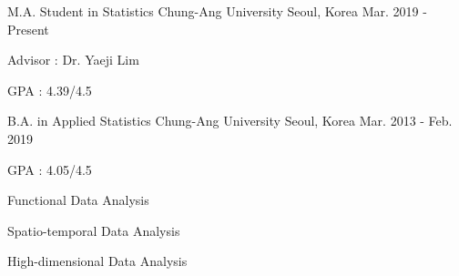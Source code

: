 \documentclass[11pt, a4paper]{awesome-cv} %
\begin{document}
\makecvheader %



\begin{cventries}
	\cventry
	{M.A. Student in Statistics} %
	{Chung-Ang University} %
	{Seoul, Korea} %
	{Mar. 2019 - Present} %
	{ %
		\begin{cvitems}
			\item {Advisor : Dr. Yaeji Lim}
			\item {GPA : 4.39/4.5}
		\end{cvitems}
	}
	
	\cventry
	{B.A. in Applied Statistics} %
	{Chung-Ang University} %
	{Seoul, Korea} %
	{Mar. 2013 - Feb. 2019} %
	{ %
		\begin{cvitems}
			\item {GPA : 4.05/4.5}
		\end{cvitems}
	}
\end{cventries}



\begin{cventries}
	\begin{cvitems}
		\begin{spacing}{1.2}
			\item {Functional Data Analysis}
			\item {Spatio-temporal Data Analysis}
			\item {High-dimensional Data Analysis}
		\end{spacing}
	\end{cvitems}
	\vspace{0.5cm}
\end{cventries}
\end{document}
